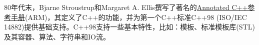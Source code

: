 
80年代末，Bjarne Stroustrup和Margaret A. Ellis撰写了著名的\href{https://www.stroustrup.com/arm.html}{Annotated C++参考手册}(ARM)，其定义了C++的功能，并为第一个C++标准C++98 (ISO/IEC 14882)提供基础支持。C++98支持一些基本特性，比如：模板、标准模板库(STL)及其容器、算法、字符串和IO流。